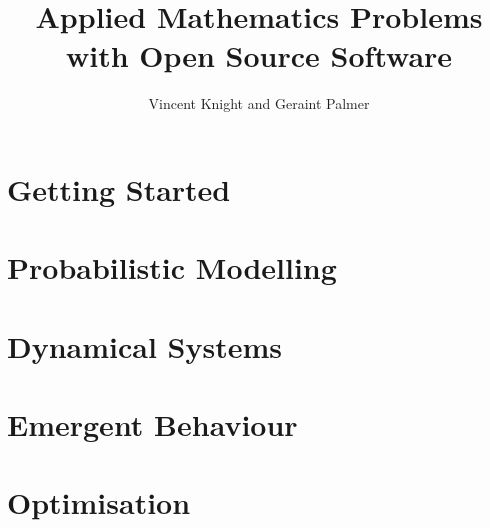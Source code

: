 \documentclass[Alon2,singlecolor,11pt]{Alon}
\title{Applied Mathematics Problems with Open Source Software}
\author{Vincent Knight and Geraint Palmer}
\begin{document}
\frontmatter



\halftitle

\booktitle

\locpage



\cleardoublepage
\setcounter{page}{7} %
\tableofcontents

%
%



\mainmatter

\part{Getting Started}


\part{Probabilistic Modelling}


\part{Dynamical Systems}


\part{Emergent Behaviour}


\part{Optimisation}



\printbibliography

\printindex
\cleardoublepage
\end{document}

